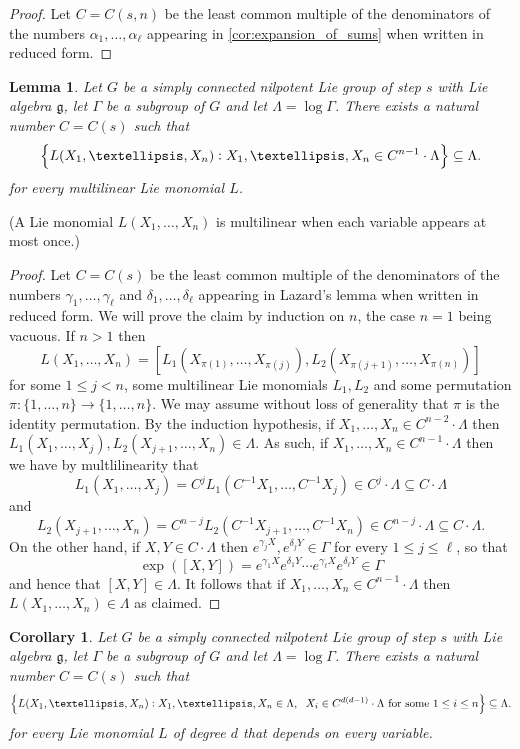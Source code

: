 \documentclass[11pt]{article}
\numberwithin{equation}{section}
\theoremstyle{plain}
\newtheorem{lemma}[thm]{Lemma}
\newtheorem{corollary}[thm]{Corollary}
\theoremstyle{definition}
\theoremstyle{remark}
\numberwithin{equation}{section}
\numberwithin{equation}{section}
\begin{document}
\begin{proof}
Let $C=C(s,n)$ be the least common multiple of the denominators of the numbers $\alpha_1,\ldots,\alpha_\ell$ appearing in \cref{cor:expansion_of_sums} when written in reduced form.
\end{proof}

\begin{lemma}
\label{lem:multlilinear_monomials}
Let $G$ be a simply connected nilpotent Lie group of step $s$ with Lie algebra $\mathfrak{g}$, let $\Gamma$ be a subgroup of $G$ and let $\Lambda = \log \Gamma$. There exists a natural number $C=C(s)$ such that
\[
\Bigl\{L(X_1,\ldots,X_n) : X_1,\ldots,X_n \in C^{n-1} \cdot \Lambda \Bigr\} \subseteq \Lambda.
\]
for every multilinear Lie monomial $L$. 
\end{lemma}

(A Lie monomial $L(X_1,\ldots,X_n)$ is multilinear when each variable appears at most once.)

\begin{proof}
Let $C=C(s)$ be the least common multiple of the denominators of the numbers $\gamma_1,\ldots,\gamma_\ell$ and $\delta_1,\ldots,\delta_\ell$ appearing in Lazard's lemma when written in reduced form. We will prove the claim by induction on $n$, the case $n=1$ being vacuous. If $n>1$ then 
\[
L(X_1,\ldots,X_n)=[L_1(X_{\pi(1)},\ldots,X_{\pi(j)}),L_2(X_{\pi(j+1)},\ldots,X_{\pi(n)})] 
\]
for some $1\leq j < n$, some multilinear Lie monomials $L_1,L_2$ and some permutation $\pi:\{1,\ldots,n\}\to\{1,\ldots,n\}$. We may assume without loss of generality that $\pi$ is the identity permutation. By the induction hypothesis, if $X_1,\ldots,X_n\in C^{n-2} \cdot \Lambda$ then $L_1(X_1,\ldots,X_j),L_2(X_{j+1},\ldots,X_n)\in \Lambda$. As such, if $X_1,\ldots,X_n \in C^{n-1} \cdot \Lambda$ then we have by multlilinearity that
\[
L_1(X_1,\ldots,X_j)=C^jL_1(C^{-1}X_1,\ldots,C^{-1}X_j)\in C^{j} \cdot \Lambda \subseteq C \cdot \Lambda \] and  \[L_2(X_{j+1},\ldots,X_n)=C^{n-j}L_2(C^{-1}X_{j+1},\ldots,C^{-1}X_n)\in C^{n-j} \cdot \Lambda \subseteq C \cdot \Lambda.
\]
On the other hand, if $X,Y\in C\cdot \Lambda$ then $e^{\gamma_j X},e^{\delta_j Y} \in \Gamma$ for every $1\leq j \leq \ell$, so that
\[
\exp([X,Y])=e^{\gamma_1 X} e^{\delta_1 Y} \cdots e^{\gamma_\ell X} e^{ \delta_\ell Y} \in \Gamma
\]
and hence that $[X,Y] \in \Lambda$. It follows that if $X_1,\ldots,X_n \in C^{n-1} \cdot \Lambda$ then $L(X_1,\ldots,X_n)\in \Lambda$ as claimed.
\end{proof}

\begin{corollary}
\label{cor:multlilinear_monomials}
Let $G$ be a simply connected nilpotent Lie group of step $s$ with Lie algebra $\mathfrak{g}$, let $\Gamma$ be a subgroup of $G$ and let $\Lambda = \log \Gamma$. There exists a natural number $C=C(s)$ such that
\[
\Bigl\{L(X_1,\ldots,X_n) : X_1,\ldots,X_n \in \Lambda,\; \text{ $X_i\in C^{d(d-1)}\cdot \Lambda$ for some $1\leq i \leq n$} \Bigr\} \subseteq \Lambda.
\]
for every Lie monomial $L$ of degree $d$ that depends on every variable. 
\end{corollary}
\end{document}
